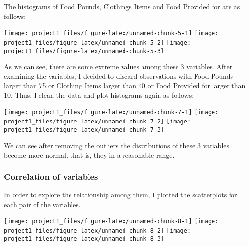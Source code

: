 \documentclass[]{article}
\newenvironment{Shaded}{\begin{snugshade}}{\end{snugshade}}
\newcommand{\DecValTok}[1]{\textcolor[rgb]{0.00,0.00,0.81}{#1}}
\newcommand{\KeywordTok}[1]{\textcolor[rgb]{0.13,0.29,0.53}{\textbf{#1}}}
\newcommand{\NormalTok}[1]{#1}
\newcommand{\OperatorTok}[1]{\textcolor[rgb]{0.81,0.36,0.00}{\textbf{#1}}}
\newcommand{\StringTok}[1]{\textcolor[rgb]{0.31,0.60,0.02}{#1}}
\begin{document}
The histograms of Food Pounds, Clothings Items and Food Provided for are
as follows:

\texttt{[image: project1\_files/figure-latex/unnamed-chunk-5-1]}
\texttt{[image: project1\_files/figure-latex/unnamed-chunk-5-2]}
\texttt{[image: project1\_files/figure-latex/unnamed-chunk-5-3]}

As we can see, there are some extreme values among these 3 variables.
After examining the variables, I decided to discard observations with
Food Pounds larger than 75 or Clothing Items larger than 40 or Food
Provided for larger than 10. Thus, I clean the data and plot histograms
again as follows:

\begin{Shaded}
\end{Shaded}

\texttt{[image: project1\_files/figure-latex/unnamed-chunk-7-1]}
\texttt{[image: project1\_files/figure-latex/unnamed-chunk-7-2]}
\texttt{[image: project1\_files/figure-latex/unnamed-chunk-7-3]}

We can see after removing the outliers the distributions of these 3
variables become more normal, that is, they in a reasonable range.

\hypertarget{correlation-of-variables}{%
\subsubsection{Correlation of
variables}\label{correlation-of-variables}}

In order to explore the relationship among them, I plotted the
scatterplots for each pair of the variables.

\texttt{[image: project1\_files/figure-latex/unnamed-chunk-8-1]}
\texttt{[image: project1\_files/figure-latex/unnamed-chunk-8-2]}
\texttt{[image: project1\_files/figure-latex/unnamed-chunk-8-3]}
\end{document}
